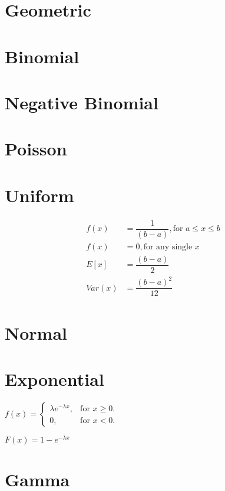 \documentclass[12pt,fleqn]{article}
\begin{document}
\setlength{\mathindent}{0pt}

\section{Geometric}
\section{Binomial}
\section{Negative Binomial}
\section{Poisson}
\section{Uniform}

\begin{align*}
	f(x) &= \dfrac{1}{(b-a)}, \text{for $a \le x \le b$}\\
	f(x) &= 0, \text{for any single $x$}\\
	E[x] &= \dfrac{(b-a)}{2}\\
	Var(x) &=\dfrac{(b-a)^2}{12}
\end{align*}

\section{Normal}
\section{Exponential}


$
f(x)=\begin{cases}
\lambda e^{-\lambda x}, & \text{for $x\ge0$}.\\
0, & \text{for $x<0$}.
\end{cases}
$

$ F(x)=1-e^{-\lambda x} $
\section{Gamma}
\end{document}
